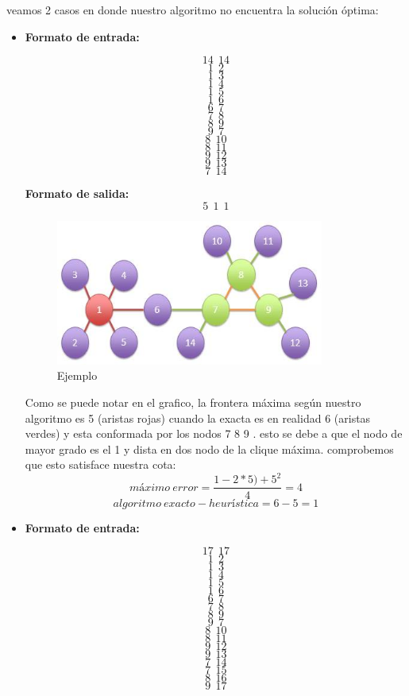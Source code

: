 veamos 2 casos en donde nuestro algoritmo no encuentra la solución óptima:
\begin {itemize}
\item
\textbf{Formato de entrada:}

$$14\ \  14$$
$$1\ \  2$$
$$1\ \  3$$
$$1\ \  4$$
$$1\ \  5$$
$$1\ \  6$$
$$6\ \  7$$
$$7 \ \ 8$$
$$8\ \  9$$
$$9\ \  7$$
$$8\ \  10$$
$$8\ \  11$$
$$9\ \  12$$
$$9\ \  13$$
$$7\ \  14$$


\textbf{Formato de salida:}
$$5\ \   1\ \   1$$
\begin{figure}[H] %
\begin{center}
\includegraphics[width=250pt]{../imgs/ej1local.jpg}
\caption{Ejemplo}
\end{center}
\end{figure}
Como se puede notar en el grafico, la frontera máxima según nuestro algoritmo es 5 (aristas rojas) cuando la exacta es en realidad 6 (aristas verdes) y esta conformada por los nodos 7 8 9 . esto se debe a que el nodo de mayor grado es el 1 y dista en dos nodo de la clique máxima. 
\newline
comprobemos que esto satisface nuestra cota:
\begin{equation}
  máximo\ error = \frac{1 - 2 * 5) + 5^{2}}{4} = 4
\end{equation}
\begin{equation}
  algoritmo\ exacto - heurística = 6 - 5 = 1
\end{equation}

\item
\textbf{Formato de entrada:}

$$17\ \  17$$
$$1\ \  2$$
$$1\ \  3$$
$$1\ \  4$$
$$1\ \  5$$
$$1\ \  6$$
$$6\ \  7$$
$$7 \ \ 8$$
$$8\ \  9$$
$$9\ \  7$$
$$8\ \  10$$
$$8\ \  11$$
$$9\ \  12$$
$$9\ \  13$$
$$7\ \  14$$
$$7\ \  15$$
$$8\ \  16$$
$$9\ \  17$$


\end{itemize}
